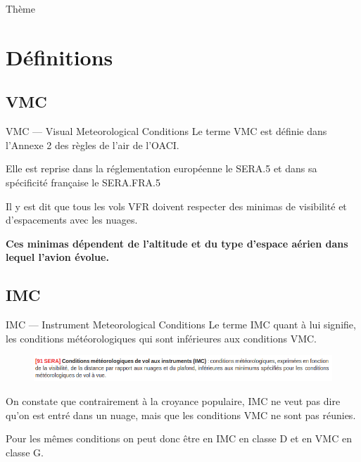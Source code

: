\documentclass{beamer}
\begin{document}
\begin{frame}{Thème}
  \tableofcontents[hideallsubsections]
\end{frame}

\section{Définitions}
\subsection{VMC}
\begin{frame}{VMC — Visual Meteorological Conditions}
  Le terme VMC est définie dans l'Annexe 2 des règles de l'air de l'OACI.
  \vspace*{1em} \pause

  Elle est reprise dans la réglementation européenne le SERA.5 et dans
  sa spécificité française le SERA.FRA.5
  \vspace*{1em} \pause

  Il y est dit que tous les vols VFR doivent respecter des minimas de
  visibilité et d'espacements avec les nuages.
  \vspace*{1em} \pause

  \textbf{Ces minimas dépendent de l'altitude et du type d'espace aérien dans
  lequel l'avion évolue.}

\end{frame}

\subsection{IMC}
\begin{frame}{IMC — Instrument Meteorological Conditions}
  Le terme IMC quant à lui signifie, les conditions météorologiques qui sont inférieures aux conditions VMC.

  \pause
  \begin{figure}
    \centering
    \includegraphics[scale=1.8]{images/sera.imc.png}
  \end{figure}

  \pause

  On constate que contrairement à la croyance populaire, IMC ne veut
  pas dire qu'on est entré dans un nuage, mais que les conditions VMC
  ne sont pas réunies.

  Pour les mêmes conditions on peut donc être en IMC en classe D et en
  VMC en classe G.
\end{frame}
\end{document}
